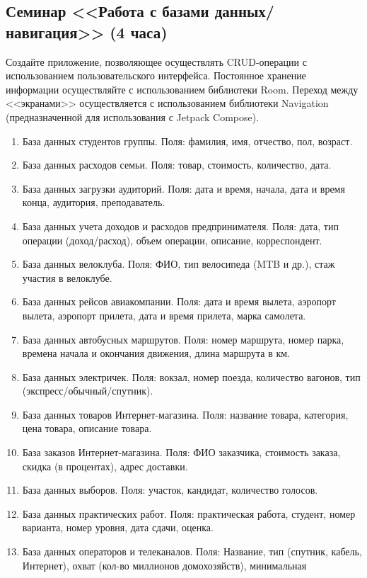 \subsection{Семинар <<Работа с базами данных/навигация>> (4 часа)}

Создайте приложение, позволяющее осуществлять CRUD-операции с использованием пользовательского интерфейса. Постоянное хранение информации
осуществляйте с использованием библиотеки Room. Переход между <<экранами>> осуществляется с использованием библиотеки Navigation (предназначенной для использования с Jetpack Compose).

\begin{enumerate}
	\item База данных студентов группы. Поля: фамилия, имя, отчество, пол, возраст. 
	\item База данных расходов семьи. Поля: товар, стоимость, количество, дата.
	\item База данных загрузки аудиторий. Поля: дата и время, начала, дата и время конца, аудитория, преподаватель. 
	\item База данных учета доходов и расходов предпринимателя. Поля: дата, тип операции (доход/расход), объем операции, описание, 
корреспондент. 
	\item База данных велоклуба. Поля: ФИО, тип велосипеда (MTB и др.), стаж участия в велоклубе.
	\item База данных рейсов авиакомпании. Поля: дата и время вылета, аэропорт вылета, аэропорт прилета, дата и время прилета, 
марка самолета.
	\item База данных автобусных маршрутов. Поля: номер маршрута, номер парка, времена начала и окончания движения,
длина маршрута в км. 
	\item База данных электричек. Поля: вокзал, номер поезда, количество вагонов, тип (экспресс/обычный/спутник).
	\item База данных товаров Интернет-магазина. Поля: название товара, категория, цена товара, описание товара. 
	\item База заказов Интернет-магазина. Поля: ФИО заказчика, стоимость заказа, скидка (в процентах), адрес доставки. 
	\item База данных выборов. Поля: участок, кандидат, количество голосов.
	\item База данных практических работ. Поля: практическая работа, студент, номер варианта, номер уровня, 
дата сдачи, оценка. 
	\item База данных операторов и телеканалов. Поля: Название, тип (спутник, кабель, Интернет), охват (кол-во миллионов домохозяйств), минимальная

\end{enumerate}
